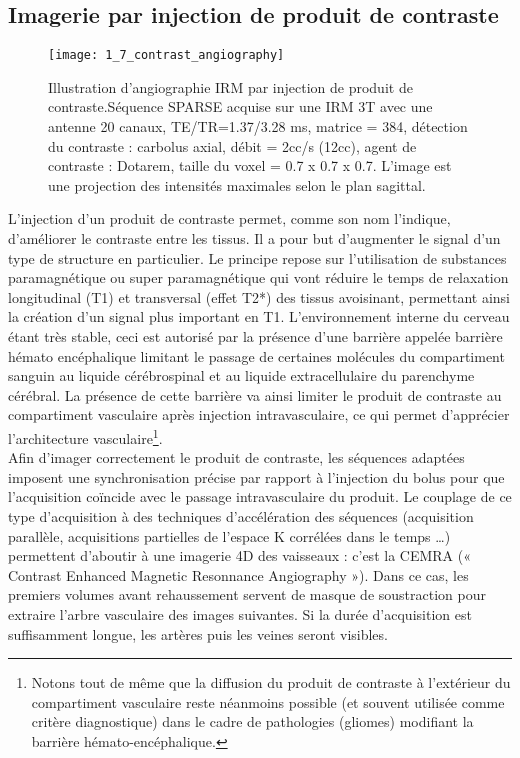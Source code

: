 \subsection{Imagerie par injection de produit de contraste}
\begin{figure}[!t]
\centering
\texttt{[image: 1\_7\_contrast\_angiography]}
\caption{Illustration d'angiographie IRM par injection de produit de contraste.Séquence SPARSE acquise sur une IRM 3T avec une antenne 20 canaux, TE/TR=1.37/3.28 ms, matrice = 384, détection du contraste : carbolus axial, débit = 2cc/s (12cc), agent de contraste : Dotarem, taille du voxel = 0.7 x 0.7 x 0.7. L'image est une projection des intensités maximales selon le plan sagittal. }
\label{fig:1_7_contrast_angiography}	
\end{figure}
L’injection d’un produit de contraste permet, comme son nom l’indique, d’améliorer le contraste entre les tissus. Il a pour but d’augmenter le signal d’un type de structure en particulier. Le principe repose sur l’utilisation de substances paramagnétique ou super paramagnétique qui vont réduire le temps de relaxation longitudinal (T1) et transversal (effet T2*) des tissus avoisinant, permettant ainsi la création d’un signal plus important en T1. L’environnement interne du cerveau étant très stable, ceci est autorisé par la présence d’une barrière appelée barrière hémato encéphalique limitant le passage de certaines molécules du compartiment sanguin au liquide cérébrospinal et au liquide extracellulaire du parenchyme cérébral. La présence de cette barrière va ainsi limiter le produit de contraste au compartiment vasculaire après injection intravasculaire, ce qui permet d’apprécier l’architecture vasculaire\footnote{Notons tout de même que la diffusion du produit de contraste à l’extérieur du compartiment vasculaire reste néanmoins possible (et souvent utilisée comme critère diagnostique) dans le cadre de pathologies (gliomes) modifiant la barrière hémato-encéphalique.}.\\
Afin d’imager correctement le produit de contraste, les séquences adaptées imposent une synchronisation précise par rapport à l’injection du bolus pour que l’acquisition coïncide avec le passage intravasculaire du produit. Le couplage de ce type d’acquisition à des techniques d’accélération des séquences (acquisition parallèle, acquisitions partielles de l’espace K corrélées dans le temps …) permettent d’aboutir à une imagerie 4D des vaisseaux : c’est la CEMRA (« Contrast Enhanced Magnetic Resonnance Angiography »). Dans ce cas, les premiers volumes avant rehaussement servent de masque de soustraction pour extraire l’arbre vasculaire des images suivantes. Si la durée d’acquisition est suffisamment longue, les artères puis les veines seront visibles.\\
